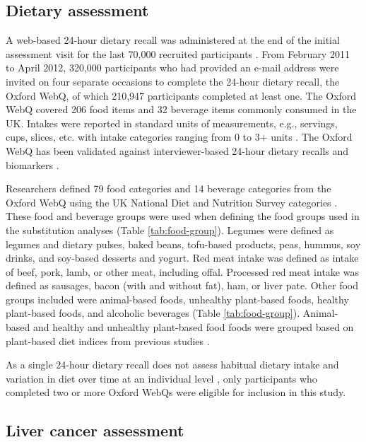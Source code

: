 \documentclass[nutrients,article,submit,moreauthors,pdftex]{Definitions/mdpi}
\begin{document}
\hypertarget{subsec2}{%
\subsection{Dietary assessment}\label{subsec2}}

A web-based 24-hour dietary recall was administered at the end of the
initial assessment visit for the last 70,000 recruited participants
\citep{RN115}. From February 2011 to April 2012, 320,000 participants who had
provided an e-mail address were invited on four separate occasions to
complete the 24-hour dietary recall, the Oxford WebQ, of which 210,947
participants completed at least one. The Oxford WebQ covered 206 food
items and 32 beverage items commonly consumed in the UK. Intakes were
reported in standard units of measurements, e.g., servings, cups,
slices, etc. with intake categories ranging from 0 to 3+ units
\citep{piernas2021}. The Oxford WebQ has been validated against
interviewer-based 24-hour dietary recalls and biomarkers \citep{Liu2011, Greenwood2019}.

Researchers defined 79 food categories and 14 beverage categories from
the Oxford WebQ using the UK National Diet and Nutrition Survey
categories \citep{piernas2021}. These food and beverage groups were used when
defining the food groups used in the substitution analyses (Table
\ref{tab:food-group}). Legumes were defined as legumes and dietary
pulses, baked beans, tofu-based products, peas, hummus, soy drinks, and
soy-based desserts and yogurt. Red meat intake was defined as intake of
beef, pork, lamb, or other meat, including offal. Processed red meat
intake was defined as sausages, bacon (with and without fat), ham, or
liver pate. Other food groups included were animal-based foods,
unhealthy plant-based foods, healthy plant-based foods, and alcoholic
beverages (Table \ref{tab:food-group}). Animal-based and healthy and
unhealthy plant-based food foods were grouped based on plant-based diet
indices from previous studies \citep{Thompson2023, Heianza2021, Satija2017, Satija2016}.

As a single 24-hour dietary recall does not assess habitual dietary
intake and variation in diet over time at an individual level
\citep{thompson2013, gurinovic2017}, only participants who completed two or
more Oxford WebQs were eligible for inclusion in this study.

\hypertarget{subsec3}{%
\subsection{Liver cancer assessment}\label{subsec3}}
\end{document}
